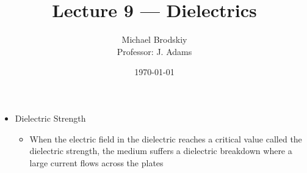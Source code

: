 


\title{Lecture 9 — Dielectrics}
\date{\today}
\author{Michael Brodskiy\\ \small Professor: J. Adams}



\maketitle

\begin{itemize}

  \item Dielectric Strength

    \begin{itemize}

      \item When the electric field in the dielectric reaches a critical value called the dielectric strength, the medium suffers a dielectric breakdown where a large current flows across the plates

    \end{itemize}

\end{itemize}



